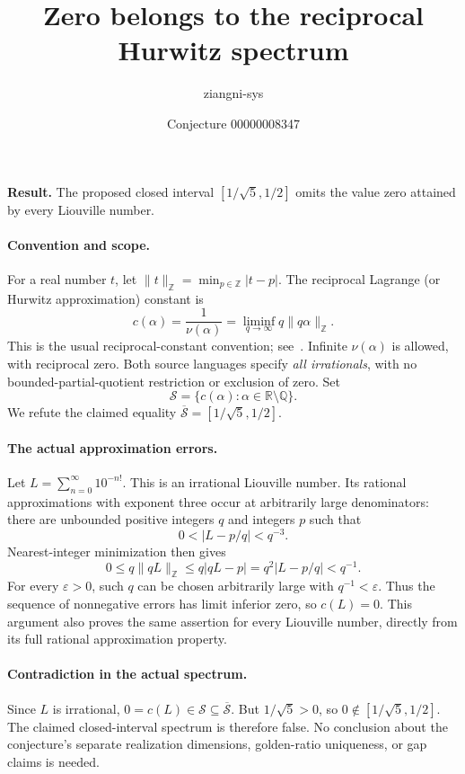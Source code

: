 \documentclass[11pt]{article}
\title{Zero belongs to the reciprocal Hurwitz spectrum}
\author{ziangni-sys}
\date{Conjecture 00000008347}
\begin{document}
\raggedright
\maketitle
\noindent\textbf{Result.} The proposed closed interval $[1/\sqrt5,1/2]$ omits the value zero attained by every Liouville number.

\paragraph{Convention and scope.}
For a real number $t$, let $\|t\|_{\mathbb Z}=\min_{p\in\mathbb Z}|t-p|$. The reciprocal Lagrange (or Hurwitz approximation) constant is
\[
c(\alpha)=\frac1{\nu(\alpha)}
=\liminf_{q\to\infty}q\|q\alpha\|_{\mathbb Z}.
\]
This is the usual reciprocal-constant convention; see~\cite{G}. Infinite $\nu(\alpha)$ is allowed, with reciprocal zero. Both source languages specify \emph{all irrationals}, with no bounded-partial-quotient restriction or exclusion of zero. Set
\[
\mathcal S=\{c(\alpha):\alpha\in\mathbb R\setminus\mathbb Q\}.
\]
We refute the claimed equality $\overline{\mathcal S}=[1/\sqrt5,1/2]$.

\paragraph{The actual approximation errors.}
Let $L=\sum_{n=0}^{\infty}10^{-n!}$. This is an irrational Liouville number. Its rational approximations with exponent three occur at arbitrarily large denominators: there are unbounded positive integers $q$ and integers $p$ such that
\[
0<|L-p/q|<q^{-3}.
\]
Nearest-integer minimization then gives
\[
0\leq q\|qL\|_{\mathbb Z}
\leq q|qL-p|=q^2|L-p/q|<q^{-1}.
\]
For every $\varepsilon>0$, such $q$ can be chosen arbitrarily large with $q^{-1}<\varepsilon$. Thus the sequence of nonnegative errors has limit inferior zero, so $c(L)=0$. This argument also proves the same assertion for every Liouville number, directly from its full rational approximation property.

\paragraph{Contradiction in the actual spectrum.}
Since $L$ is irrational, $0=c(L)\in\mathcal S\subseteq\overline{\mathcal S}$. But $1/\sqrt5>0$, so $0\notin[1/\sqrt5,1/2]$. The claimed closed-interval spectrum is therefore false. No conclusion about the conjecture's separate realization dimensions, golden-ratio uniqueness, or gap claims is needed.
\end{document}

